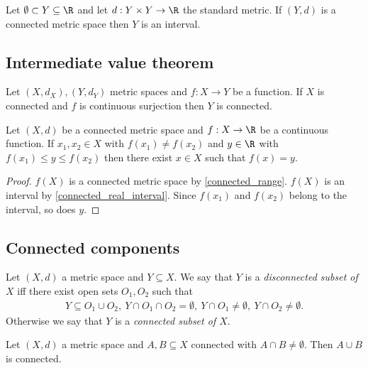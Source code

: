 \documentclass{article}
\begin{document}
\begin{proposition}[10.5]
	\label{connected_real_interval}
	Let $\emptyset\subset Y\subseteq\R$ and let $d:Y\times Y\to\R$ the standard metric.
	If $(Y,d)$ is a connected metric space then $Y$ is an interval.
\end{proposition}

\subsection{Intermediate value theorem}

\begin{proposition}[10.6]
	\label{connected_range}
	Let $(X,d_X),(Y,d_Y)$ metric spaces and $f:X\to Y$ be a function. If $X$ is connected
	and $f$ is continuous surjection then $Y$ is connected.
\end{proposition}

\begin{theorem}
	Let $(X,d)$ be a connected metric space and $f:X\to\R$ be a continuous function. If
	$x_1,x_2\in X$ with $f(x_1)\neq f(x_2)$ and $y\in\R$ with $f(x_1)\leq y\leq f(x_2)$ then there exist
	$x\in X$ such that $f(x)=y$.
	\begin{proof}
		$f(X)$ is a connected metric space by \ref{connected_range}.
		$f(X)$ is an interval by \ref{connected_real_interval}.
		Since $f(x_1)$ and $f(x_2)$ belong to the interval, so does $y$.
	\end{proof}
\end{theorem}

\subsection{Connected components}

\begin{definition}
	Let $(X,d)$ a metric space and $Y\subseteq X$. We say that $Y$ is a \emph{disconnected
		subset of $X$} iff there exist open sets $O_1,O_2$ such that
	\begin{align*}
		Y\subseteq O_1\cup O_2,\: Y\cap O_1\cap O_2 = \emptyset,\: Y\cap O_1\neq\emptyset,
		\:Y\cap O_2\not=\emptyset.
	\end{align*}
	Otherwise we say that $Y$ is a \emph{connected subset of $X$}.
\end{definition}

\begin{proposition}[10.11]
	Let $(X,d)$ a metric space and $A,B\subseteq X$ connected with $A\cap B\neq\emptyset$.
	Then $A\cup B$ is connected.
\end{proposition}
\end{document}
